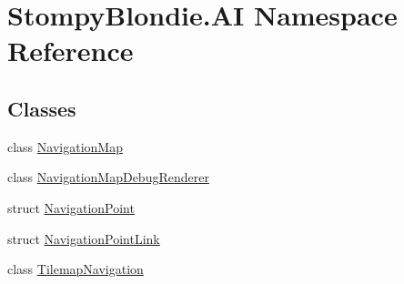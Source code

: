 \hypertarget{namespace_stompy_blondie_1_1_a_i}{}\section{Stompy\+Blondie.\+AI Namespace Reference}
\label{namespace_stompy_blondie_1_1_a_i}
\subsection*{Classes}
\begin{DoxyCompactItemize}
\item 
class \mbox{\hyperlink{class_stompy_blondie_1_1_a_i_1_1_navigation_map}{Navigation\+Map}}
\item 
class \mbox{\hyperlink{class_stompy_blondie_1_1_a_i_1_1_navigation_map_debug_renderer}{Navigation\+Map\+Debug\+Renderer}}
\item 
struct \mbox{\hyperlink{struct_stompy_blondie_1_1_a_i_1_1_navigation_point}{Navigation\+Point}}
\item 
struct \mbox{\hyperlink{struct_stompy_blondie_1_1_a_i_1_1_navigation_point_link}{Navigation\+Point\+Link}}
\item 
class \mbox{\hyperlink{class_stompy_blondie_1_1_a_i_1_1_tilemap_navigation}{Tilemap\+Navigation}}
\end{DoxyCompactItemize}
